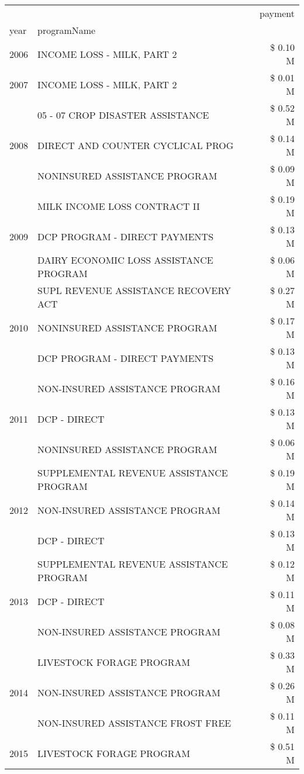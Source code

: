 \begin{tabular}{llr}
\toprule
 &  & payment \\
year & programName &  \\
\midrule
2006 & INCOME LOSS - MILK, PART 2 & \$ 0.10 M \\
\cline{1-3}
2007 & INCOME LOSS - MILK, PART 2 & \$ 0.01 M \\
\cline{1-3}
\multirow[t]{3}{*}{2008} & 05 - 07 CROP DISASTER ASSISTANCE & \$ 0.52 M \\
 & DIRECT AND COUNTER CYCLICAL PROG & \$ 0.14 M \\
 & NONINSURED ASSISTANCE PROGRAM & \$ 0.09 M \\
\cline{1-3}
\multirow[t]{3}{*}{2009} & MILK INCOME LOSS CONTRACT II & \$ 0.19 M \\
 & DCP PROGRAM - DIRECT PAYMENTS & \$ 0.13 M \\
 & DAIRY ECONOMIC LOSS ASSISTANCE PROGRAM & \$ 0.06 M \\
\cline{1-3}
\multirow[t]{3}{*}{2010} & SUPL REVENUE ASSISTANCE RECOVERY ACT & \$ 0.27 M \\
 & NONINSURED ASSISTANCE PROGRAM & \$ 0.17 M \\
 & DCP PROGRAM - DIRECT PAYMENTS & \$ 0.13 M \\
\cline{1-3}
\multirow[t]{3}{*}{2011} & NON-INSURED ASSISTANCE PROGRAM & \$ 0.16 M \\
 & DCP - DIRECT & \$ 0.13 M \\
 & NONINSURED ASSISTANCE PROGRAM & \$ 0.06 M \\
\cline{1-3}
\multirow[t]{3}{*}{2012} & SUPPLEMENTAL REVENUE ASSISTANCE PROGRAM & \$ 0.19 M \\
 & NON-INSURED ASSISTANCE PROGRAM & \$ 0.14 M \\
 & DCP - DIRECT & \$ 0.13 M \\
\cline{1-3}
\multirow[t]{3}{*}{2013} & SUPPLEMENTAL REVENUE ASSISTANCE PROGRAM & \$ 0.12 M \\
 & DCP - DIRECT & \$ 0.11 M \\
 & NON-INSURED ASSISTANCE PROGRAM & \$ 0.08 M \\
\cline{1-3}
\multirow[t]{3}{*}{2014} & LIVESTOCK FORAGE PROGRAM & \$ 0.33 M \\
 & NON-INSURED ASSISTANCE PROGRAM & \$ 0.26 M \\
 & NON-INSURED ASSISTANCE FROST FREE & \$ 0.11 M \\
\cline{1-3}
\multirow[t]{3}{*}{2015} & LIVESTOCK FORAGE PROGRAM & \$ 0.51 M \\

\end{tabular}

